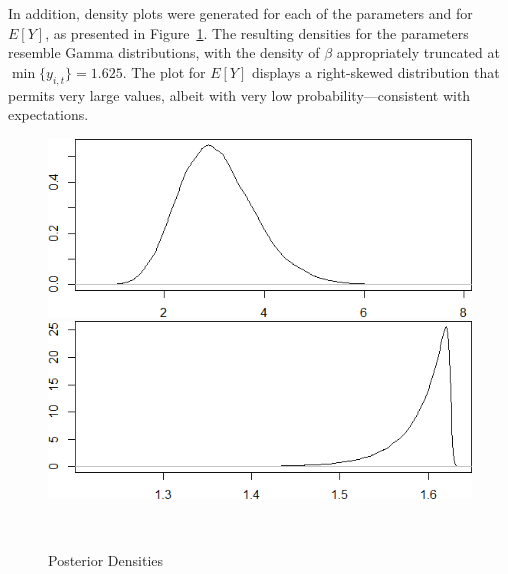 \documentclass{Class/julia}
\begin{document}
In addition, density plots were generated for each of the parameters and for \( E[Y] \), as presented in Figure~\ref{fig:1}. The resulting densities for the parameters resemble Gamma distributions, with the density of \( \beta \) appropriately truncated at \( \min\{y_{i,t}\} = 1.625 \). The plot for \( E[Y] \) displays a right-skewed distribution that permits very large values, albeit with very low probability---consistent with expectations.

\begin{figure}[!ht]
    \centering
    \caption{Posterior Densities}
    \label{fig:1}
    \begin{minipage}{0.45\textwidth}
        \centering
        \includegraphics[width=\textwidth]{rytgaard1990/density_alpha.png}
        \subcaption{\( \alpha \)}
    \end{minipage}%
    \hfill
    \begin{minipage}{0.45\textwidth}
        \centering
        \includegraphics[width=\textwidth]{rytgaard1990/density_beta.png}
        \subcaption{\( \beta \)}
    \end{minipage} \\
    
    \vspace{0.5cm}
    

\end{figure}
\end{document}
